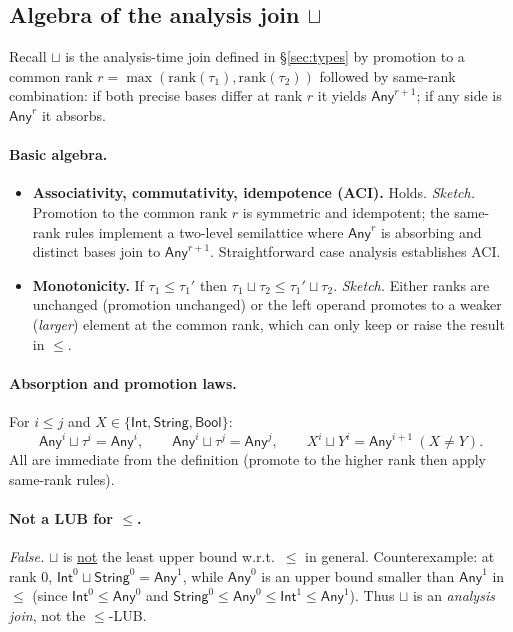 \subsection{Algebra of the analysis join $\boldsymbol{\sqcup}$}
Recall $\sqcup$ is the analysis-time join defined in \S\ref{sec:types} by
promotion to a common rank $r=\max(\mathrm{rank}(\tau_1),\mathrm{rank}(\tau_2))$
followed by same-rank combination:
if both precise bases differ at rank $r$ it yields $\mathsf{Any}^{r+1}$; if any side is $\mathsf{Any}^{r}$ it absorbs.

\paragraph{Basic algebra.}
\begin{itemize}
\item \textbf{Associativity, commutativity, idempotence (ACI).} Holds.
\emph{Sketch.} Promotion to the common rank $r$ is symmetric and idempotent; the same-rank rules implement a two-level semilattice where $\mathsf{Any}^{r}$ is absorbing and distinct bases join to $\mathsf{Any}^{r+1}$. Straightforward case analysis establishes ACI.
\item \textbf{Monotonicity.} If $\tau_1\le\tau_1'$ then $\tau_1\sqcup \tau_2 \le \tau_1'\sqcup \tau_2$.
\emph{Sketch.} Either ranks are unchanged (promotion unchanged) or the left operand promotes to a weaker (\emph{larger}) element at the common rank, which can only keep or raise the result in $\le$.
\end{itemize}

\paragraph{Absorption and promotion laws.}
For $i\le j$ and $X\in\{\mathsf{Int},\mathsf{String},\mathsf{Bool}\}$:
\[
\mathsf{Any}^{i}\sqcup \tau^{i}=\mathsf{Any}^{i},\qquad
\mathsf{Any}^{i}\sqcup \tau^{j}=\mathsf{Any}^{j},\qquad
X^{i}\sqcup Y^{i}=\mathsf{Any}^{i+1}\ (X\neq Y).
\]
All are immediate from the definition (promote to the higher rank then apply same-rank rules).

\paragraph{Not a LUB for $\le$.}
\emph{False.} $\sqcup$ is \underline{not} the least upper bound w.r.t.\ $\le$ in general.
Counterexample: at rank $0$,
$\mathsf{Int}^{0}\sqcup \mathsf{String}^{0}=\mathsf{Any}^{1}$,
while $\mathsf{Any}^{0}$ is an upper bound smaller than $\mathsf{Any}^{1}$ in $\le$ (since $\mathsf{Int}^{0}\le\mathsf{Any}^{0}$ and $\mathsf{String}^{0}\le\mathsf{Any}^{0}\le \mathsf{Int}^{1}\le \mathsf{Any}^{1}$).
Thus $\sqcup$ is an \emph{analysis join}, not the $\le$-LUB.

